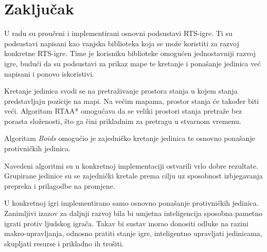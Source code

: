 \documentclass[times, utf8, zavrsni, numeric]{fer}
\begin{document}
\chapter{Zaključak}\label{ch:conclusion}

\par U radu su proučeni i implementirani osnovni podsustavi RTS-igre.
Ti su podsustavi napisani kao vanjska biblioteka koja se može koristiti za razvoj konkretne RTS-igre.
Time je korisniku biblioteke omogućen jednostavniji razvoj igre, budući da su podsustavi za prikaz mape te kretanje i ponašanje jedinica već napisani i ponovo iskoristivi.

\par Kretanje jedinica svodi se na pretraživanje prostora stanja u kojem stanja predstavljaju pozicije na mapi.
Na većim mapama, prostor stanja će također biti veći.
Algoritam RTAA* omogućava da se veliki prostori stanja pretraže bez porasta složenosti, što ga čini prikladnim za pretragu u stvarnom vremenu.

\par Algoritam \textit{Boids} omogućio je zajedničko kretanje jedinica te osnovno ponašanje protivničkih jedinica.

\par Navedeni algoritmi su u konkretnoj implementaciji ostvarili vrlo dobre rezultate.
Grupirane jedinice su se zajednički kretale prema cilju uz sposobnost izbjegavanja prepreka i prilagodbe na promjene.

\par U konkretnoj igri implementirano samo osnovno ponašanje protivničkih jedinica. Zanimljivi izazov za daljnji razvoj bila bi umjetna inteligencija sposobna pametno igrati protiv ljudskog igrača.
Takav bi sustav morao donositi odluke na razini makro-upravljanja, odnosno pratiti stanje igre, inteligentno upravljati jedinicama, skupljati resurse i prikladno ih trošiti. 



\end{document}
